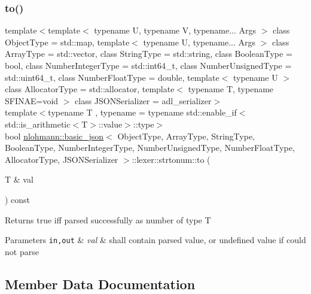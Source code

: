 \subsubsection{\texorpdfstring{to()}{to()}}
{\footnotesize\ttfamily template$<$template$<$ typename U, typename V, typename... Args $>$ class Object\+Type = std\+::map, template$<$ typename U, typename... Args $>$ class Array\+Type = std\+::vector, class String\+Type  = std\+::string, class Boolean\+Type  = bool, class Number\+Integer\+Type  = std\+::int64\+\_\+t, class Number\+Unsigned\+Type  = std\+::uint64\+\_\+t, class Number\+Float\+Type  = double, template$<$ typename U $>$ class Allocator\+Type = std\+::allocator, template$<$ typename T, typename S\+F\+I\+N\+A\+E=void $>$ class J\+S\+O\+N\+Serializer = adl\+\_\+serializer$>$ \\
template$<$typename T , typename  = typename std\+::enable\+\_\+if$<$std\+::is\+\_\+arithmetic$<$\+T$>$\+::value$>$\+::type$>$ \\
bool \hyperlink{classnlohmann_1_1basic__json}{nlohmann\+::basic\+\_\+json}$<$ Object\+Type, Array\+Type, String\+Type, Boolean\+Type, Number\+Integer\+Type, Number\+Unsigned\+Type, Number\+Float\+Type, Allocator\+Type, J\+S\+O\+N\+Serializer $>$\+::lexer\+::strtonum\+::to (\begin{DoxyParamCaption}\item[{T \&}]{val }\end{DoxyParamCaption}) const\hspace{0.3cm}{\ttfamily [inline]}}

\begin{DoxyReturn}{Returns}
true iff parsed successfully as number of type T
\end{DoxyReturn}

\begin{DoxyParams}[1]{Parameters}
\mbox{\tt in,out}  & {\em val} & shall contain parsed value, or undefined value if could not parse \\
\hline
\end{DoxyParams}


\subsection{Member Data Documentation}
\mbox{\label{structnlohmann_1_1basic__json_1_1lexer_1_1strtonum_a4878c8bc7756e8ff1cde8b7aa50c85c8}} 
